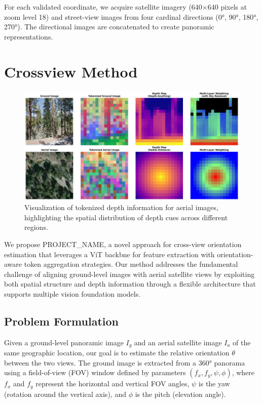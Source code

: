 \documentclass{bmvc2k}
\begin{document}
For each validated coordinate, we acquire satellite imagery (640×640 pixels at zoom level 18) and street-view images from four cardinal directions (0°, 90°, 180°, 270°). The directional images are concatenated to create panoramic representations.

\section{Crossview Method}
\label{sec:method}

\begin{figure}[t]
    \centering
    \includegraphics[width=0.9\linewidth]{images/tokenized_depth_visualization.png}
    \caption{Visualization of tokenized depth information for aerial images, highlighting the spatial distribution of depth cues across different regions.}
    \label{fig:method}
\end{figure}

We propose PROJECT\_NAME, a novel approach for cross-view orientation estimation that leverages a ViT backbne for feature extraction with orientation-aware token aggregation strategies. Our method addresses the fundamental challenge of aligning ground-level images with aerial satellite views by exploiting both spatial structure and depth information through a flexible architecture that supports multiple vision foundation models.

\subsection{Problem Formulation}

Given a ground-level panoramic image $I_g$ and an aerial satellite image $I_a$ of the same geographic location, our goal is to estimate the relative orientation $\theta$ between the two views. The ground image is extracted from a 360° panorama using a field-of-view (FOV) window defined by parameters $(f_x, f_y, \psi, \phi)$, where $f_x$ and $f_y$ represent the horizontal and vertical FOV angles, $\psi$ is the yaw (rotation around the vertical axis), and $\phi$ is the pitch (elevation angle).
\end{document}
